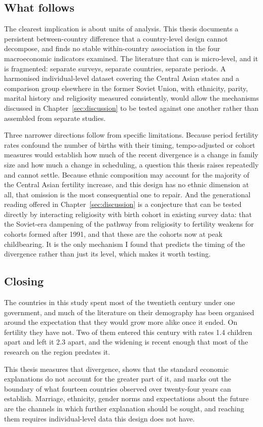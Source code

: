 \subsection{What follows}
\label{sec:further-research}

The clearest implication is about units of analysis. This thesis documents a persistent between-country difference that a country-level design cannot decompose, and finds no stable within-country association in the four macroeconomic indicators examined. The literature that can is micro-level, and it is fragmented: separate surveys, separate countries, separate periods. A harmonised individual-level dataset covering the Central Asian states and a comparison group elsewhere in the former Soviet Union, with ethnicity, parity, marital history and religiosity measured consistently, would allow the mechanisms discussed in Chapter~\ref{sec:discussion} to be tested against one another rather than assembled from separate studies.

Three narrower directions follow from specific limitations. Because period fertility rates confound the number of births with their timing, tempo-adjusted or cohort measures would establish how much of the recent divergence is a change in family size and how much a change in scheduling, a question this thesis raises repeatedly and cannot settle. Because ethnic composition may account for the majority of the Central Asian fertility increase, and this design has no ethnic dimension at all, that omission is the most consequential one to repair. And the generational reading offered in Chapter~\ref{sec:discussion} is a conjecture that can be tested directly by interacting religiosity with birth cohort in existing survey data: that the Soviet-era dampening of the pathway from religiosity to fertility weakens for cohorts formed after 1991, and that these are the cohorts now at peak childbearing. It is the only mechanism I found that predicts the timing of the divergence rather than just its level, which makes it worth testing.

\subsection{Closing}
\label{sec:closing}

The countries in this study spent most of the twentieth century under one government, and much of the literature on their demography has been organised around the expectation that they would grow more alike once it ended. On fertility they have not. Two of them entered this century with rates 1.4 children apart and left it 2.3 apart, and the widening is recent enough that most of the research on the region predates it.

This thesis measures that divergence, shows that the standard economic explanations do not account for the greater part of it, and marks out the boundary of what fourteen countries observed over twenty-four years can establish. Marriage, ethnicity, gender norms and expectations about the future are the channels in which further explanation should be sought, and reaching them requires individual-level data this design does not have.
